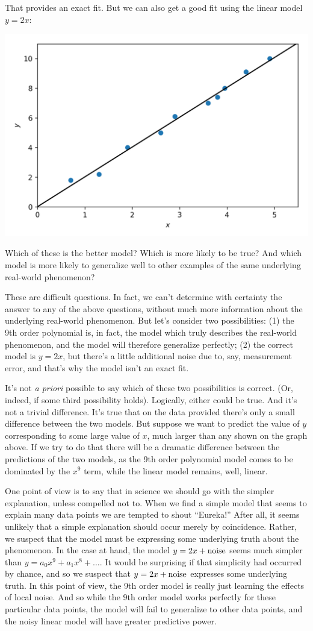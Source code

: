 \documentclass[a4paper,twoside,10pt]{book}
\begin{document}
That provides an exact fit. But we can also get a good fit using the linear model $y=2x$:
\begin{center}
	\includegraphics[width=0.7\linewidth]{figures/ch3/animation_overfitting3}
\end{center}
Which of these is the better model? Which is more likely to be true? And which model is more likely to generalize well to other examples of the same underlying real-world phenomenon?

These are difficult questions. In fact, we can't determine with certainty the answer to any of the above questions, without much more information about the underlying real-world phenomenon. But let's consider two possibilities: (1) the 9th order polynomial is, in fact, the model which truly describes the real-world phenomenon, and the model will therefore generalize perfectly; (2) the correct model is $y=2x$, but there's a little additional noise due to, say, measurement error, and that's why the model isn't an exact fit.

It's not \textit{a priori} possible to say which of these two possibilities is correct. (Or, indeed, if some third possibility holds). Logically, either could be true. And it's not a trivial difference. It's true that on the data provided there's only a small difference between the two models. But suppose we want to predict the value of $y$ corresponding to some large value of $x$, much larger than any shown on the graph above. If we try to do that there will be a dramatic difference between the predictions of the two models, as the 9th order polynomial model comes to be dominated by the $x^9$ term, while the linear model remains, well, linear.

One point of view is to say that in science we should go with the simpler explanation, unless compelled not to. When we find a simple model that seems to explain many data points we are tempted to shout ``Eureka!'' After all, it seems unlikely that a simple explanation should occur merely by coincidence. Rather, we suspect that the model must be expressing some underlying truth about the phenomenon. In the case at hand, the model $y=2x+{\rm noise}$ seems much simpler than $y=a_0x^9+a_1x^8+\ldots$. It would be surprising if that simplicity had occurred by chance, and so we suspect that $y=2x+{\rm noise}$ expresses some underlying truth. In this point of view, the 9th order model is really just learning the effects of local noise. And so while the 9th order model works perfectly for these particular data points, the model will fail to generalize to other data points, and the noisy linear model will have greater predictive power.
\end{document}
